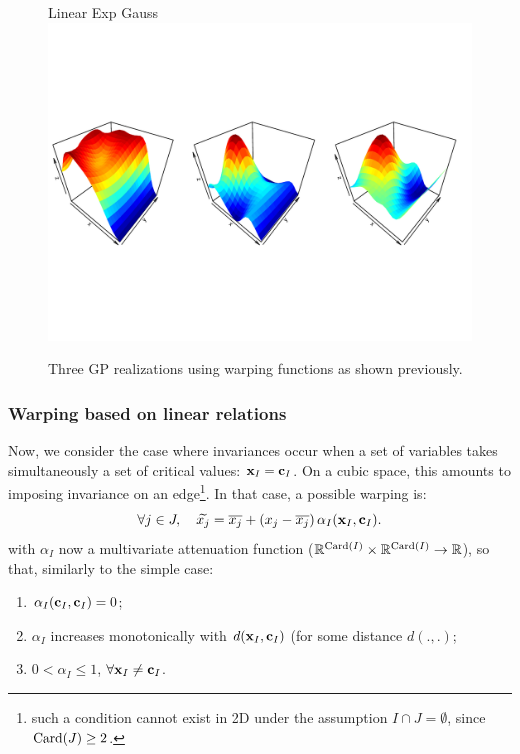 \begin{figure}[!ht]
\centering
Linear \hspace{4cm} Exp \hspace{4cm} Gauss
 \includegraphics[trim=2mm 45mm 2mm 45mm,clip, width=\textwidth]{simu2Dsimple.pdf}
 \caption{Three GP realizations using warping functions as shown previously.}\label{fig:simu2Dsimple}
\end{figure}

\subsubsection{Warping based on linear relations}

Now, we consider the case where invariances occur when a set of variables takes simultaneously a set of critical values: $\mathbf{x}_I = \mathbf{c}_I$.
On a cubic space, this amounts to imposing invariance on an edge\footnote{such a condition 
cannot exist in 2D under the assumption $I \cap J = \emptyset$, since $\operatorname{Card}(J) \geq 2$.}. In that case, a possible warping is:
\begin{equation}
 \forall j \in J, \quad \widetilde{x_j} = \overline{x_j} + \left( x_j - \overline{x_j}\right) {\alpha_I}(\mathbf{x}_I, \mathbf{c}_I)\label{eq:and}.
\end{equation}
with ${\alpha_I}$ now a multivariate attenuation function ($\mathbb{R}^{\operatorname{Card}(I)} \times \mathbb{R}^{\operatorname{Card}(I)} \rightarrow \mathbb{R}$), so that, similarly to the simple case: 
\begin{enumerate}
 \item $\alpha_I(\mathbf{c}_I, \mathbf{c}_I) = 0$;
 \item $\alpha_I$ increases monotonically with $d(\mathbf{x}_I, \mathbf{c}_I)$ (for some distance $d(.,.)$;
 \item $0 < \alpha_I \leq 1$, $\forall \mathbf{x}_I \neq \mathbf{c}_I$.
\end{enumerate}

